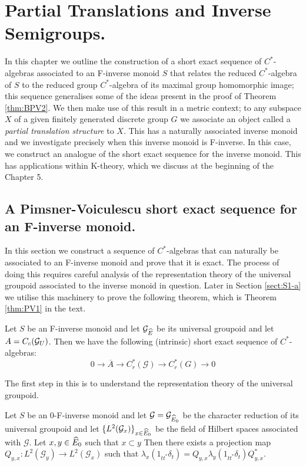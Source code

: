 \chapter{Partial Translations and Inverse Semigroups.}

In this chapter we outline the construction of a short exact sequence of $C^{*}$-algebras associated to an F-inverse monoid $S$ that relates the reduced $C^{*}$-algebra of $S$ to the reduced group $C^{*}$-algebra of its maximal group homomorphic image; this sequence generalises some of the ideas present in the proof of Theorem \ref{thm:BPV2}. We then make use of this result in a metric context; to any subspace $X$ of a given finitely generated discrete group $G$ we associate an object called a \textit{partial translation structure} to $X$. This has a naturally associated inverse monoid and we investigate precisely when this inverse monoid is F-inverse. In this case, we construct an analogue of the short exact sequence for the inverse monoid. This has applications within K-theory, which we discuss at the beginning of the Chapter 5.

\section{A Pimsner-Voiculescu short exact sequence for an F-inverse monoid.}\label{sect:S1}
In this section we construct a sequence of $C^{*}$-algebras that can naturally be associated to an F-inverse monoid and prove that it is exact. The process of doing this requires careful analysis of the representation theory of the universal groupoid associated to the inverse monoid in question. Later in Section \ref{sect:S1-a} we utilise this machinery to prove the following theorem, which is Theorem \ref{thm:PV1} in the text.

\begin{thm}
Let $S$ be an F-inverse monoid and let $\mathcal{G}_{\widehat{E}}$ be its universal groupoid and let $A=C_{c}(\mathcal{G}_{U})$. Then we have the following (intrinsic) short exact sequence of $C^{*}$-algebras:
\begin{equation*}
0 \rightarrow \overline{A} \rightarrow C^{*}_{r}(\mathcal{G}) \rightarrow C^{*}_{r}(G) \rightarrow 0
\end{equation*}
\end{thm}

The first step in this is to understand the representation theory of the universal groupoid.

\begin{lemma}\label{lem:L2}
Let $S$ be an 0-F-inverse monoid and let $\mathcal{G}=\mathcal{G}_{\widehat{E}_{0}}$ be the character reduction of its universal groupoid and let $\lbrace L^{2}(\mathcal{G}_{x}) \rbrace_{x \in \widehat{E}_{0}}$ be the field of Hilbert spaces associated with $\mathcal{G}$. Let $x,y \in \widehat{E}_{0}$ such that $x \subset y$ Then there exists a projection map $Q_{y,x}: L^{2}(\mathcal{G}_{y}) \rightarrow L^{2}(\mathcal{G}_{x})$ such that $\lambda_{x}(1_{tt^{*}}\delta_{t}) = Q_{y,x}\lambda_{y}(1_{tt^{*}}\delta_{t})Q_{y,x}^{*}$.
\end{lemma}

